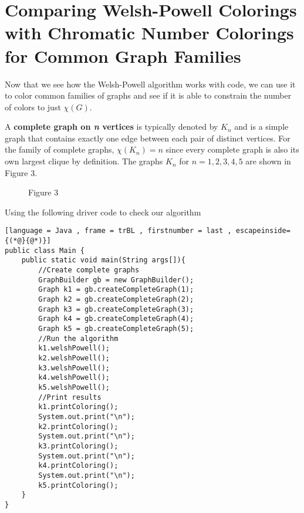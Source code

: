 \documentclass[12pt, letterpaper]{article}
\begin{document}
\section*{Comparing Welsh-Powell Colorings with Chromatic Number Colorings for Common Graph Families}


Now that we see how the Welsh-Powell algorithm works with code, we can use it to color common families of graphs and see if it is able to constrain the number of colors to just $\chi(G)$.


A \textbf{complete graph on \textit{n} vertices} is typically denoted by $K_n$ and is a simple graph that contains exactly one edge between each pair of distinct vertices. For the family of complete graphs, $\chi(K_n)=n$ since every complete graph is also its own largest clique by definition. The graphs $K_n$ for $n=1,2,3,4,5$ are shown in Figure 3.


\begin{figure}[H]%
\begin{center}
	\qquad
	\qquad
	\qquad
	\qquad
	\caption*{Figure 3}
\end{center}
\end{figure}


Using the following driver code to check our algorithm


\begin{lstlisting}[language = Java , frame = trBL , firstnumber = last , escapeinside={(*@}{@*)}]
public class Main {
    public static void main(String args[]){
        //Create complete graphs
		GraphBuilder gb = new GraphBuilder();
        Graph k1 = gb.createCompleteGraph(1);
        Graph k2 = gb.createCompleteGraph(2);
        Graph k3 = gb.createCompleteGraph(3);
        Graph k4 = gb.createCompleteGraph(4);
        Graph k5 = gb.createCompleteGraph(5);
        //Run the algorithm
        k1.welshPowell();
        k2.welshPowell();
        k3.welshPowell();
        k4.welshPowell();
        k5.welshPowell();
        //Print results
        k1.printColoring();
        System.out.print("\n");
        k2.printColoring();
        System.out.print("\n");
        k3.printColoring();
        System.out.print("\n");
        k4.printColoring();
        System.out.print("\n");
        k5.printColoring();
	}
}
\end{lstlisting}
\end{document}

